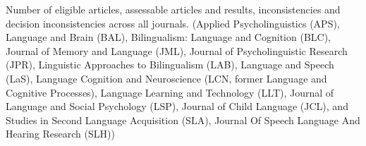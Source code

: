 \documentclass[
  doc,
  longtable,
  nolmodern,
  notxfonts,
  notimes,
  colorlinks=true,linkcolor=blue,citecolor=blue,urlcolor=blue]{apa7}
\begin{document}
\begin{table}

{\caption{{Number of eligible articles, assessable articles and results,
inconsistencies and decision inconsistencies across all journals.
(Applied Psycholinguistics (APS), Language and Brain (BAL),
Bilingualism: Language and Cognition (BLC), Journal of Memory and
Language (JML), Journal of Psycholinguistic Research (JPR), Linguistic
Approaches to Bilingualism (LAB), Language and Speech (LaS), Language
Cognition and Neuroscience (LCN, former Language and Cognitive
Processes), Language Learning and Technology (LLT), Journal of Language
and Social Psychology (LSP), Journal of Child Language (JCL), and
Studies in Second Language Acquisition (SLA), Journal Of Speech Language
And Hearing Research (SLH))}{\label{tbl-summary}}}}


\end{table}
\end{document}
